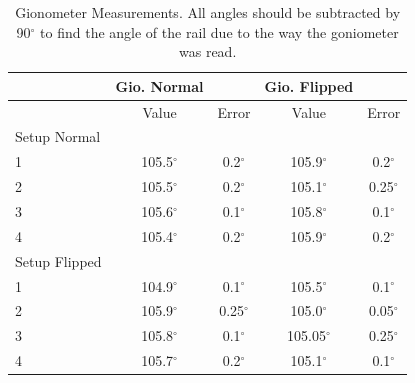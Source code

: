 \documentclass[a4paper,%
               aps,%
               prl,%
               amsfonts,%
               amssymb,%
               amsmath,%
               nobibnotes,%
               twocolumn, %
               twoside,%
               balancelastpage,%
               eqsecnum] %
               {revtex4-1}
\begin{document}
\begin{table}[H]
    \centering
    \begin{tabular}{lcc|cc}
    \hline
    & Gio. Normal && Gio. Flipped &\\
    \hline
    &Value &Error & Value & Error\\
    \hline
    \hline
    Setup Normal &&&&\\
    \hline
    1 & 105.5$^{\circ}$ & 0.2$^{\circ}$ & 105.9$^{\circ}$ & 0.2$^{\circ}$\\
    2 & 105.5$^{\circ}$ & 0.2$^{\circ}$ & 105.1$^{\circ}$ & 0.25$^{\circ}$\\
    3 & 105.6$^{\circ}$ & 0.1$^{\circ}$ & 105.8$^{\circ}$ & 0.1$^{\circ}$\\
    4 & 105.4$^{\circ}$ & 0.2$^{\circ}$ & 105.9$^{\circ}$ & 0.2$^{\circ}$\\
    \hline
    \hline
    Setup Flipped &&&&\\
    \hline
    1 & 104.9$^{\circ}$ & 0.1$^{\circ}$ & 105.5$^{\circ}$ & 0.1$^{\circ}$\\
    2 & 105.9$^{\circ}$ & 0.25$^{\circ}$ & 105.0$^{\circ}$ & 0.05$^{\circ}$\\
    3 & 105.8$^{\circ}$ & 0.1$^{\circ}$ & 105.05$^{\circ}$ & 0.25$^{\circ}$\\
    4 & 105.7$^{\circ}$ & 0.2$^{\circ}$ & 105.1$^{\circ}$ & 0.1$^{\circ}$\\
    \hline
    \end{tabular}
    \caption{Gionometer Measurements. All angles should be subtracted by 90$^{\circ}$ to find the angle of the rail due to the way the goniometer was read.}
    \label{tab:angles1}
\end{table}
\end{document}
